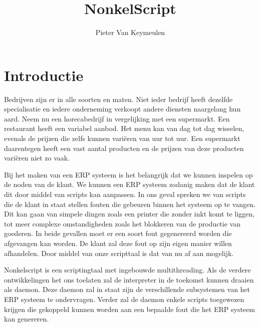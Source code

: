 \documentclass[11pt,a4paper]{article}
\author{Pieter Van Keymeulen}
\title{NonkelScript}
\begin{document}

\newpage

\tableofcontents
\newpage

\section{Introductie}
Bedrijven zijn er in alle soorten en maten. Niet ieder bedrijf heeft dezelfde specialisatie en iedere onderneming verkoopt andere diensten naargelang hun aard. Neem nu een horecabedrijf in vergelijking met een supermarkt. Een restaurant heeft een variabel aanbod. Het menu kan van dag tot dag wisselen, evenals de prijzen die zelfs kunnen variëren van uur tot uur. Een supermarkt daarentegen heeft een vast aantal producten en de prijzen van deze producten variëren niet zo vaak.

Bij het maken van een ERP systeem is het belangrijk dat we kunnen inspelen op de noden van de klant. We kunnen een ERP systeem zodanig maken dat de klant dit door middel van scripts kan aanpassen. In ons geval spreken we van scripts die de klant in staat stellen fouten die gebeuren binnen het systeem op te vangen. Dit kan gaan van simpele dingen zoals een printer die zonder inkt komt te liggen, tot meer complexe omstandigheden zoals het blokkeren van de productie van goederen. In beide gevallen moet er een soort fout gegenereerd worden die afgevangen kan worden. De klant zal deze fout op zijn eigen manier willen afhandelen. Door middel van onze scripttaal is dat van nu af aan mogelijk.

Nonkelscript is een scriptingtaal met ingebouwde multithreading. Als de verdere ontwikkelingen het ons toelaten zal de  interpreter in de toekomst kunnen draaien als daemon. Deze daemon zal in staat zijn de verschillende subsystemen van het ERP systeem te ondervragen. Verder zal de daemon enkele scripts toegewezen krijgen die gekoppeld kunnen worden aan een bepaalde fout die het ERP systeem kan genereren.
\end{document}
